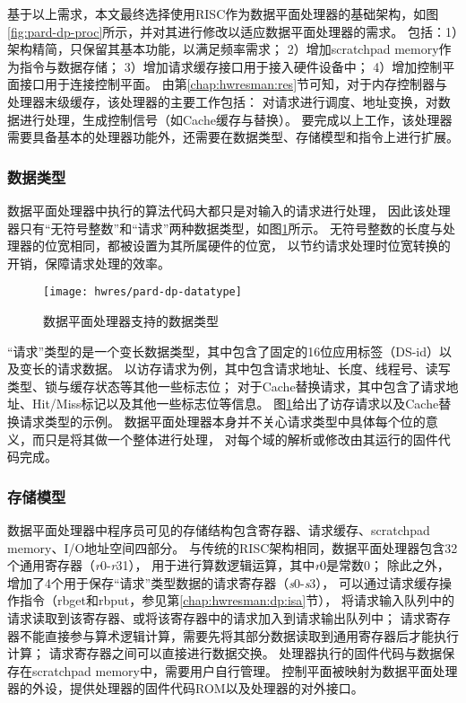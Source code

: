 基于以上需求，本文最终选择使用RISC作为数据平面处理器的基础架构，如图\ref{fig:pard-dp-proc}所示，并对其进行修改以适应数据平面处理器的需求。
包括：1）架构精简，只保留其基本功能，以满足频率需求；
2）增加scratchpad memory作为指令与数据存储；
3）增加请求缓存接口用于接入硬件设备中；
4）增加控制平面接口用于连接控制平面。
由第\ref{chap:hwresman:res}节可知，对于内存控制器与处理器末级缓存，该处理器的主要工作包括：
对请求进行调度、地址变换，对数据进行处理，生成控制信号（如Cache缓存与替换）。
要完成以上工作，该处理器需要具备基本的处理器功能外，还需要在数据类型、存储模型和指令上进行扩展。

\subsubsection{数据类型}

数据平面处理器中执行的算法代码大都只是对输入的请求进行处理，
因此该处理器只有``无符号整数''和``请求''两种数据类型，如图\ref{fig:pard-dp-datatype}所示。
无符号整数的长度与处理器的位宽相同，都被设置为其所属硬件的位宽，
以节约请求处理时位宽转换的开销，保障请求处理的效率。

\begin{figure}[b]
  \centering
  \texttt{[image: hwres/pard-dp-datatype]}
  \caption{数据平面处理器支持的数据类型}
  \label{fig:pard-dp-datatype}
\end{figure}
 
``请求''类型的是一个变长数据类型，其中包含了固定的16位应用标签（DS-id）以及变长的请求数据。
以访存请求为例，其中包含请求地址、长度、线程号、读写类型、锁与缓存状态等其他一些标志位；
对于Cache替换请求，其中包含了请求地址、Hit/Miss标记以及其他一些标志位等信息。
图\ref{fig:pard-dp-datatype}给出了访存请求以及Cache替换请求类型的示例。
数据平面处理器本身并不关心请求类型中具体每个位的意义，而只是将其做一个整体进行处理，
对每个域的解析或修改由其运行的固件代码完成。

\subsubsection{存储模型}
数据平面处理器中程序员可见的存储结构包含寄存器、请求缓存、scratchpad memory、I/O地址空间四部分。
与传统的RISC架构相同，数据平面处理器包含32个通用寄存器（\textit{r}0-\textit{r}31），
用于进行算数逻辑运算，其中\textit{r}0是常数0；
除此之外，增加了4个用于保存``请求''类型数据的请求寄存器（\textit{s}0-\textit{s}3），
可以通过请求缓存操作指令（rbget和rbput，参见第\ref{chap:hwresman:dp:isa}节），
将请求输入队列中的请求读取到该寄存器、或将该寄存器中的请求加入到请求输出队列中；
请求寄存器不能直接参与算术逻辑计算，需要先将其部分数据读取到通用寄存器后才能执行计算；
请求寄存器之间可以直接进行数据交换。
处理器执行的固件代码与数据保存在scratchpad memory中，需要用户自行管理。
控制平面被映射为数据平面处理器的外设，提供处理器的固件代码ROM以及处理器的对外接口。

